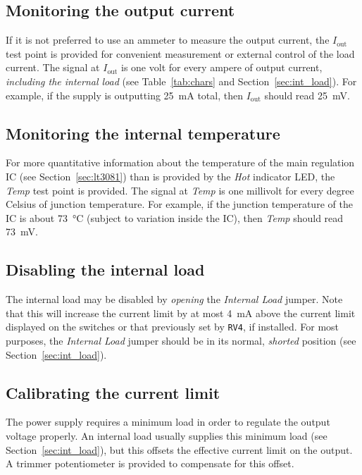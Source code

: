 \documentclass[letterpaper,twocolumn,10pt]{article}
\newcommand{\refdes}[1]{\texttt{#1}}
\begin{document}
\subsection{Monitoring the output current}

If it is not preferred to use an ammeter to measure the output current, the
\textit{$I_\text{out}$} test point is provided for convenient measurement or
external control of the load current. The signal at \textit{$I_\text{out}$}
is one volt for every ampere of output current, \emph{including the internal
load} (see Table~\ref{tab:chars} and Section~\ref{sec:int_load}). For example,
if the supply is outputting \SI{25}{\mA} total, then \textit{$I_\text{out}$}
should read \SI{25}{\mV}.

\subsection{Monitoring the internal temperature}

For more quantitative information about the temperature of the main regulation
IC (see Section~\ref{sec:lt3081}) than is provided by the \textit{Hot} indicator
LED, the \textit{Temp} test point is provided. The signal at \textit{Temp} is
one millivolt for every degree Celsius of junction temperature. For example, if
the junction temperature of the IC is about \SI{73}{\celsius} (subject to
variation inside the IC), then \textit{Temp} should read \SI{73}{\mV}.

\subsection{Disabling the internal load}

The internal load may be disabled by \emph{opening} the \textit{Internal Load}
jumper.  Note that this will increase the current limit by at most \SI{4}{\mA}
above the current limit displayed on the switches or that previously set by
\refdes{RV4}, if installed. For most purposes, the \textit{Internal Load} jumper
should be in its normal, \emph{shorted} position (see
Section~\ref{sec:int_load}).

\subsection{Calibrating the current limit}

The power supply requires a minimum load in order to regulate the output voltage
properly. An internal load usually supplies this minimum load (see
Section~\ref{sec:int_load}), but this offsets the effective current limit on the
output. A trimmer potentiometer is provided to compensate for this offset.
\end{document}
